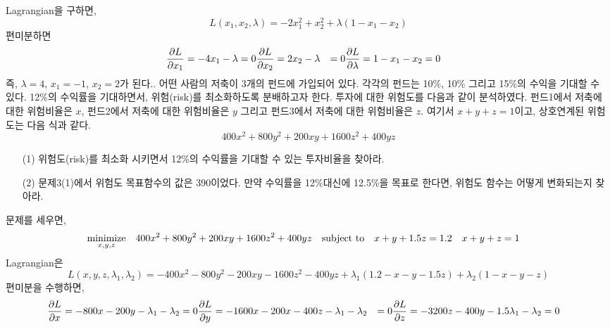 \documentclass[a4,10pt]{article}
\theoremstyle{examplestyle}
\let\\\tabularnewline
\let\\\tabularnewline
\begin{document}
 Lagrangian을 구하면,
\begin{equation*}
L(x_{1},x_{2},\lambda)=-2x_{1}^{2}+x_{2}^{2}+\lambda(1-x_{1}-x_{2})
\end{equation*}
편미분하면
\begin{align*}
\frac{\partial L}{\partial x_{1}}=-4x_{1}-\lambda&=0\\
\frac{\partial L}{\partial x_{2}}=2x_{2}-\lambda&=0\\
\frac{\partial L}{\partial \lambda}=1-x_{1}-x_{2}&=0
\end{align*}
즉, $\lambda=4$, $x_{1}=-1$, $x_{2}=2$가 된다.\\
3. 어떤 사람의 저축이 3개의 펀드에 가입되어 있다. 각각의 펀드는 10\%, 10\% 그리고 15\%의 수익을 기대할 수 있다. 12\%의 수익률을 기대하면서, 위험(risk)를 최소화하도록 분배하고자 한다. 투자에 대한 위험도를 다음과 같이 분석하였다. 펀드1에서 저축에 대한 위험비율은 $x$, 펀드2에서 저축에 대한 위험비율은 $y$ 그리고 펀드3에서 저축에 대한 위험비율은 $z$. 여기서 $x+y+z=1$이고, 상호연계된 위험도는 다음 식과 같다.
\begin{equation*}
400x^2+800y^2+200xy+1600z^2+400yz
\end{equation*}
\begin{itemize}
\item[(1)] 위험도(risk)를 최소화 시키면서 12\%의 수익률을 기대할 수 있는 투자비율을 찾아라.
\item[(2)] 문제3(1)에서 위험도 목표함수의 값은 390이었다. 만약 수익률을 12\%대신에 12.5\%을 목표로 한다면, 위험도 함수는 어떻게 변화되는지 찾아라.
\end{itemize}
 문제를 세우면,
\begin{equation*}
\begin{aligned}
& \underset{x,y,z}{\text{minimize}}& &400x^{2}+800y^{2}+200xy+1600z^{2}+400yz\\
& \text{subject to}& & x+y+1.5z=1.2\\
& & & x+y+z=1\\
\end{aligned}
\end{equation*}
Lagrangian은
\begin{equation*}
L(x,y,z,\lambda_{1},\lambda_{2})=-400x^{2}-800y^{2}-200xy-1600z^{2}-400yz+\lambda_{1}(1.2-x-y-1.5z)+\lambda_{2}(1-x-y-z)
\end{equation*}
편미분을 수행하면,
\begin{align*}
\frac{\partial L}{\partial x}=-800x-200y-\lambda_{1}-\lambda_{2}&=0\\
\frac{\partial L}{\partial y}=-1600x-200x-400z-\lambda_{1}-\lambda_{2}&=0\\
\frac{\partial L}{\partial z}=-3200z-400y-1.5\lambda_{1}-\lambda_{2}&=0
\end{align*}
\end{document}
